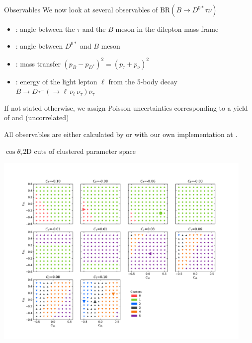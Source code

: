 \begin{frame}{Observables}
	We now look at several observables of $\mathrm{BR}(B\to D^{0*} \tau\nu)$
	
	\bigskip
	\begin{itemize}
		\item \hhl{$\theta_\tau$}: angle between the $\tau$ and the $B$ meson in the dilepton mass frame
		\item {}: angle between $D^{0*}$ and $B$ meson
		\item {}: mass transfer $(p_B-p_{D^*})^2=(p_\tau+p_\nu)^2$
		\item {}: energy of the light lepton $\ell$ from the 5-body decay $\bar B\to D \tau^-(\to\ell\, \bar\nu_\ell\,\nu_\tau)\bar\nu_\tau$
	\end{itemize}

	\bigskip
	If not stated otherwise, we assign Poisson uncertainties corresponding to a yield of  and  (uncorrelated)
	
	\bigskip
	All observables are either calculated by  or with our own implementation at .
\end{frame}

\begin{frame}{$\cos\theta_\tau$}{2D cuts of clustered parameter space}
	\begin{changemargin}{-1cm}{-1cm}
		\centering
		\includegraphics[width=12.5cm,clip,trim=0cm 0cm 0cm 2cm]{figures/from-paper/cosl_clust2D.pdf}
	\end{changemargin}
\end{frame}
%
